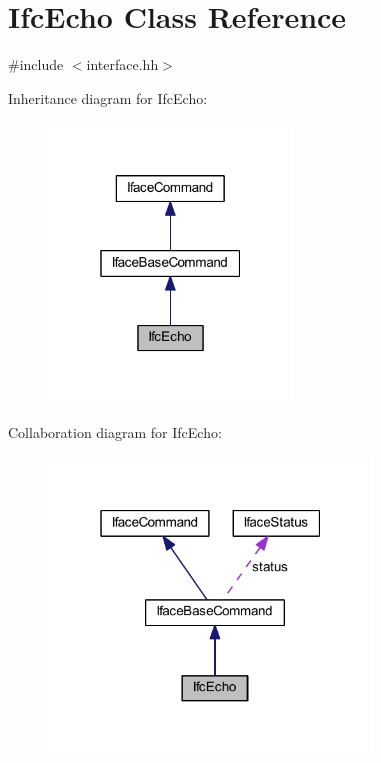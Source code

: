 \hypertarget{class_ifc_echo}{}\section{Ifc\+Echo Class Reference}
\label{class_ifc_echo}


{\ttfamily \#include $<$interface.\+hh$>$}



Inheritance diagram for Ifc\+Echo\+:
\nopagebreak
\begin{figure}[H]
\begin{center}
\leavevmode
\includegraphics[width=184pt]{class_ifc_echo__inherit__graph}
\end{center}
\end{figure}


Collaboration diagram for Ifc\+Echo\+:
\nopagebreak
\begin{figure}[H]
\begin{center}
\leavevmode
\includegraphics[width=244pt]{class_ifc_echo__coll__graph}
\end{center}
\end{figure}
